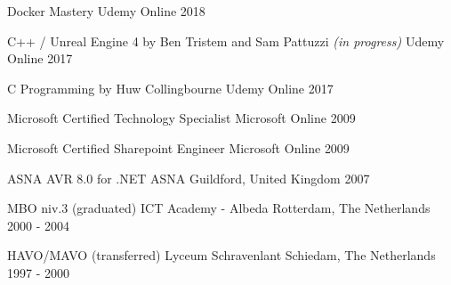 \begin{cventries}
  \cventry
    {Docker Mastery} %
    {Udemy} %
    {Online} %
    {2018} %
    {
    }

  \cventry
    {C++ / Unreal Engine 4 by Ben Tristem and Sam Pattuzzi {\textit{(in progress)}}} %
    {Udemy} %
    {Online} %
    {2017} %
    {
    }

  \cventry
    {C Programming by Huw Collingbourne} %
    {Udemy} %
    {Online} %
    {2017} %
    {
    }
    
  \cventry
    {Microsoft Certified Technology Specialist} %
    {Microsoft} %
    {Online} %
    {2009} %
    {
    }
    
  \cventry
    {Microsoft Certified Sharepoint Engineer} %
    {Microsoft} %
    {Online} %
    {2009} %
    {
    }
    
  \cventry
    {ASNA AVR 8.0 for .NET} %
    {ASNA} %
    {Guildford, United Kingdom} %
    {2007} %
    {
    }
    
  \cventry
    {MBO niv.3 (graduated)} %
    {ICT Academy - Albeda} %
    {Rotterdam, The Netherlands} %
    {2000 - 2004} %
    {
    }

  \cventry
    {HAVO/MAVO (transferred)} %
    {Lyceum Schravenlant} %
    {Schiedam, The Netherlands} %
    {1997 - 2000} %
    {
    }
    
\end{cventries}
